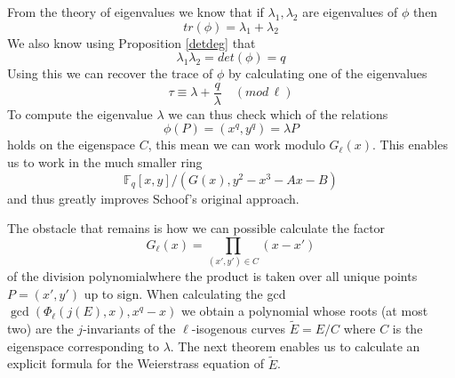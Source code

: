 From the theory of eigenvalues we know that if $\lambda_1, \lambda_2$ are
eigenvalues of $\phi$ then $$tr(\phi) = \lambda_1 + \lambda_2$$
We also know using Proposition \ref{detdeg} that $$\lambda_1 \lambda_2 = det(\phi) = q $$
Using this we can recover the trace of $\phi$ by calculating one of the eigenvalues
$$ \tau \equiv \lambda + \frac{q}{\lambda} \quad (mod\, \ell) $$
To compute the eigenvalue $\lambda$ we can thus check which of the relations
$$ \phi(P) = (x^q, y^q) = \lambda P$$
holds on the eigenspace $C$, this mean we can work modulo $G_\ell(x)$. This enables us
to work in the much smaller ring $$\mathbb{F}_q[x,y]/(G(x), y^2 - x^3 - Ax - B) $$
and thus greatly improves Schoof's original approach.

The obstacle that remains is how we can possible calculate the factor 
$$ G_\ell(x) = \prod_{(x',y')\in C} (x-x')$$
of the division polynomialwhere the product is taken over all 
unique points $P = (x', y')$ up to sign. When calculating the gcd
$\gcd(\Phi_\ell(j(E), x), x^q - x)$ we obtain a polynomial whose roots
(at most two) are the $j$-invariants of the $\ell$-isogenous curves
$\tilde{E} = E/C$ where $C$ is the eigenspace corresponding to $\lambda$.
The next theorem enables us to calculate an explicit formula for the Weierstrass
equation of $\tilde{E}$.

